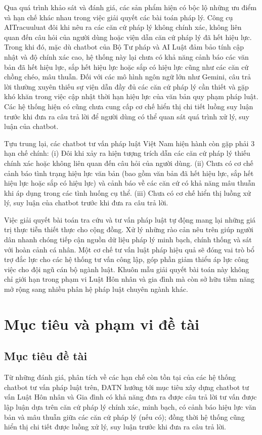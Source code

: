 \documentclass[../DoAn.tex]{subfiles}
\begin{document}
Qua quá trình khảo sát và đánh giá, các sản phẩm hiện có bộc lộ những ưu điểm và hạn chế khác nhau trong việc giải quyết các bài toán pháp lý. Công cụ AITracuuluat đôi khi nêu ra các căn cứ pháp lý không chính xác, không liên quan đến câu hỏi của người dùng hoặc viện dẫn căn cứ pháp lý đã hết hiệu lực. Trong khi đó, mặc dù chatbot của Bộ Tư pháp và AI Luật đảm bảo tính cập nhật và độ chính xác cao, hệ thống này lại chưa có khả năng cảnh báo các văn bản đã hết hiệu lực, sắp hết hiệu lực hoặc sắp có hiệu lực cũng như các căn cứ chồng chéo, mâu thuẫn. Đối với các mô hình ngôn ngữ lớn như Gemini, câu trả lời thường xuyên thiếu sự viện dẫn đầy đủ các căn cứ pháp lý cần thiết và gặp khó khăn trong việc cập nhật thời hạn hiệu lực của văn bản quy phạm pháp luật. Các hệ thống hiện có cũng chưa cung cấp cơ chế hiển thị chi tiết luồng suy luận trước khi đưa ra câu trả lời để người dùng có thể quan sát quá trình xử lý, suy luận của chatbot.


Tựu trung lại, các chatbot tư vấn pháp luật Việt Nam hiện hành còn gặp phải 3 hạn chế chính: (i) Đôi khi xảy ra hiện tượng trích dẫn các căn cứ pháp lý thiếu chính xác hoặc không liên quan đến câu hỏi của người dùng. (ii) Chưa có cơ chế cảnh báo tình trạng hiệu lực văn bản (bao gồm văn bản đã hết hiệu lực, sắp hết hiệu lực hoặc sắp có hiệu lực) và cảnh báo về các căn cứ có khả năng mâu thuẫn khi áp dụng trong các tình huống cụ thể. (iii) Chưa có cơ chế hiển thị luồng xử lý, suy luận của chatbot trước khi đưa ra câu trả lời.


Việc giải quyết bài toán tra cứu và tư vấn pháp luật tự động mang lại những giá trị thực tiễn thiết thực cho cộng đồng. Xử lý những rào cản nêu trên giúp người dân nhanh chóng tiếp cận nguồn dữ liệu pháp lý minh bạch, chính thống và sát với hoàn cảnh cá nhân. Một cơ chế tư vấn luật pháp hiệu quả sẽ đóng vai trò bổ trợ đắc lực cho các hệ thống tư vấn công lập, góp phần giảm thiểu áp lực công việc cho đội ngũ cán bộ ngành luật. Khuôn mẫu giải quyết bài toán này không chỉ giới hạn trong phạm vi Luật Hôn nhân và gia đình mà còn sở hữu tiềm năng mở rộng sang nhiều phân hệ pháp luật chuyên ngành khác.


\section{Mục tiêu và phạm vi đề tài}
\label{section:1.2}
\subsection{Mục tiêu đề tài}
\label{subsection:1.2.1}
Từ những đánh giá, phân tích về các hạn chế còn tồn tại của các hệ thống chatbot tư vấn pháp luật trên, ĐATN hướng tới mục tiêu xây dựng chatbot tư vấn Luật Hôn nhân và Gia đình có khả năng đưa ra được câu trả lời tư vấn được lập luận dựa trên căn cứ pháp lý chính xác, minh bạch, có cảnh báo hiệu lực văn bản và mâu thuẫn giữa các căn cứ pháp lý (nếu có); đồng thời hệ thống cũng hiển thị chi tiết được luồng xử lý, suy luận trước khi đưa ra câu trả lời.
\end{document}
